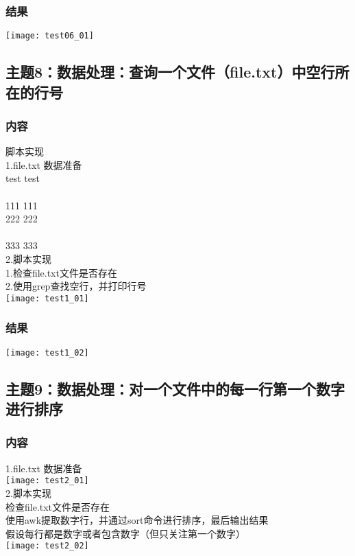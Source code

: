 \documentclass{article}
\begin{document}
\subsubsection{结果} 
\texttt{[image: test06\_01]}\\
\subsection{主题8：数据处理：查询一个文件（file.txt）中空行所在的行号}  
\subsubsection{内容}
脚本实现\\
1.file.txt 数据准备\\
test test\\
\\
111 111\\
222 222\\
\\
333 333\\
2.脚本实现\\
1.检查file.txt文件是否存在  \\
2.使用grep查找空行，并打印行号  \\
\texttt{[image: test1\_01]}\\
\subsubsection{结果}  
\texttt{[image: test1\_02]}\\
\vspace{1cm}
\subsection{主题9：数据处理：对一个文件中的每一行第一个数字进行排序}  
\subsubsection{内容}
1.file.txt 数据准备\\
\texttt{[image: test2\_01]}\\
2.脚本实现\\
检查file.txt文件是否存在 \\
使用awk提取数字行，并通过sort命令进行排序，最后输出结果\\
假设每行都是数字或者包含数字（但只关注第一个数字）\\
\texttt{[image: test2\_02]}\\
\end{document}
